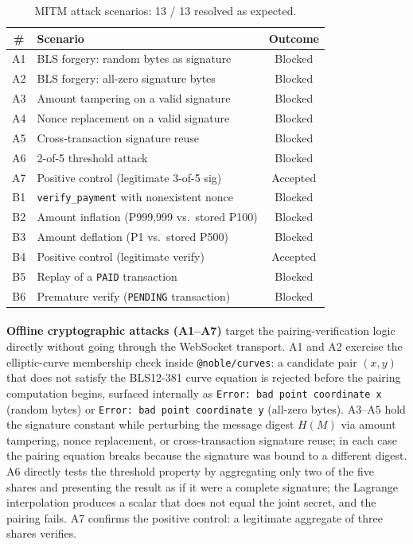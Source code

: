 \begin{table}[H]
  \centering
  \caption{MITM attack scenarios: 13 / 13 resolved as expected.}
  \label{tab:mitm}
  \begin{tabular}{|c|l|c|}
    \hline
    \# & Scenario & Outcome \\\hline
    A1 & BLS forgery: random bytes as signature & Blocked \\\hline
    A2 & BLS forgery: all-zero signature bytes & Blocked \\\hline
    A3 & Amount tampering on a valid signature & Blocked \\\hline
    A4 & Nonce replacement on a valid signature & Blocked \\\hline
    A5 & Cross-transaction signature reuse & Blocked \\\hline
    A6 & 2-of-5 threshold attack & Blocked \\\hline
    A7 & Positive control (legitimate 3-of-5 sig) & Accepted \\\hline
    B1 & \texttt{verify\_payment} with nonexistent nonce & Blocked \\\hline
    B2 & Amount inflation (₱999{,}999 vs.\ stored ₱100) & Blocked \\\hline
    B3 & Amount deflation (₱1 vs.\ stored ₱500) & Blocked \\\hline
    B4 & Positive control (legitimate verify) & Accepted \\\hline
    B5 & Replay of a \texttt{PAID} transaction & Blocked \\\hline
    B6 & Premature verify (\texttt{PENDING} transaction) & Blocked \\\hline
  \end{tabular}
\end{table}

\paragraph{}\textbf{Offline cryptographic attacks (A1--A7)} target the pairing-verification logic directly without going through the WebSocket transport. A1 and A2 exercise the elliptic-curve membership check inside \texttt{@noble/curves}: a candidate pair $(x, y)$ that does not satisfy the BLS12-381 curve equation is rejected before the pairing computation begins, surfaced internally as \texttt{Error: bad point coordinate x} (random bytes) or \texttt{Error: bad point coordinate y} (all-zero bytes). A3--A5 hold the signature constant while perturbing the message digest $H(M)$ via amount tampering, nonce replacement, or cross-transaction signature reuse; in each case the pairing equation breaks because the signature was bound to a different digest. A6 directly tests the threshold property by aggregating only two of the five shares and presenting the result as if it were a complete signature; the Lagrange interpolation produces a scalar that does not equal the joint secret, and the pairing fails. A7 confirms the positive control: a legitimate aggregate of three shares verifies.

